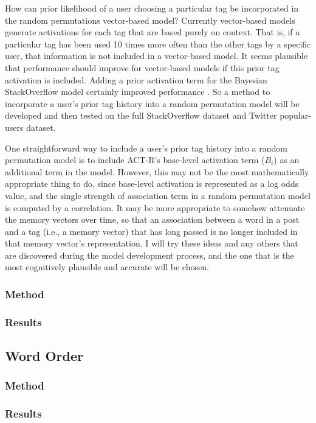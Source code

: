 \documentclass[man,floatsintext,donotrepeattitle]{apa6}
\begin{document}
How can prior likelihood of a user choosing a particular tag be incorporated in the random permutations vector-based model?
Currently vector-based models generate activations for each tag that are based purely on context.
That is, if a particular tag has been used 10 times more often than the other tags by a specific user, that information is not included in a vector-based model.
It seems plausible that performance should improve for vector-based models if this prior tag activation is included.
Adding a prior activation term for the Bayesian StackOverflow model certainly improved performance \parencite{Stanley2013}.
So a method to incorporate a user's prior tag history into a random permutation model will be developed and then tested on the full StackOverflow dataset and Twitter popular-users dataset.

One straightforward way to include a user's prior tag history into a random permutation model is to include ACT-R's base-level activation term ($B_{i}$) as an additional term in the model.
However, this may not be the most mathematically appropriate thing to do, since base-level activation is represented as a log odds value,
and the single strength of association term in a random permutation model is computed by a correlation.
It may be more appropriate to somehow attenuate the memory vectors over time,
so that an association between a word in a post and a tag (i.e., a memory vector) that has long passed is no longer included in that memory vector's representation.
I will try these ideas and any others that are discovered during the model development process, and the one that is the most cognitively plausible and accurate will be chosen.

\subsubsection{Method}
\subsubsection{Results}

\subsection{Word Order}

\subsubsection{Method}
\subsubsection{Results}
\end{document}
